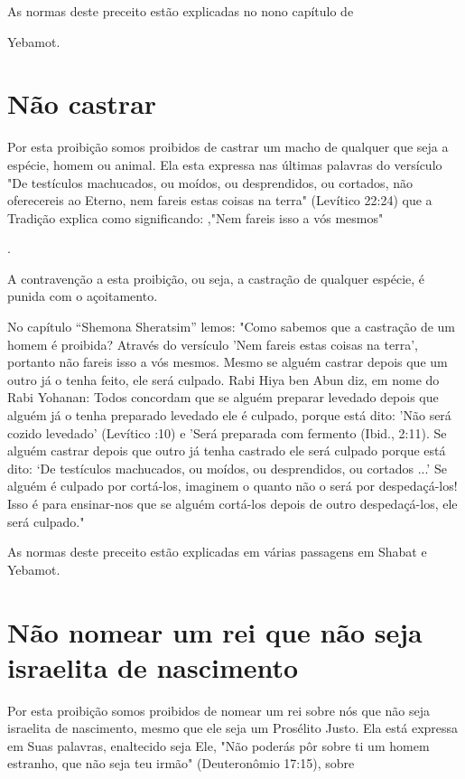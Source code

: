 As normas deste preceito estão explicadas no nono capítulo de


Yebamot.

\section{Não castrar}

Por esta proibição somos proibidos de castrar um macho de qual­quer que
seja a espécie, homem ou animal. Ela esta expressa nas últimas pala­vras
do versículo "De testículos machucados, ou moídos, ou desprendidos, ou
cortados, não oferecereis ao Eterno, nem fareis estas coisas na terra"
(Levítico 22:24) que a Tradição explica como significando: ,"Nem fareis
isso a vós mesmos"

.

A contravenção a esta proibição, ou seja, a castração de qualquer
es­pécie, é punida com o açoitamento.

No capítulo ``Shemona Sheratsim'' lemos: "Como sabemos que a cas­tração de
um homem é proibida? Através do versículo 'Nem fareis estas coisas na
terra', portanto não fareis isso a vós mesmos. Mesmo se alguém castrar
de­pois que um outro já o tenha feito, ele será culpado. Rabi Hiya ben
Abun diz, em nome do Rabi Yohanan: Todos concordam que se alguém
preparar leveda­do depois que alguém já o tenha preparado levedado ele é
culpado, porque está dito: 'Não será cozido levedado' (Levítico :10) e
'Será preparada com fer­mento (Ibid., 2:11). Se alguém castrar depois
que outro já tenha castrado ele será culpado porque está dito: `De
testículos machucados, ou moídos, ou des­prendidos, ou cortados ...' Se
alguém é culpado por cortá-los, imaginem o quanto não o será por
despedaçá-los! Isso é para ensinar-nos que se alguém cortá-los depois de
outro despedaçá-los, ele será culpado."

As normas deste preceito estão explicadas em várias passagens em Shabat
e Yebamot.

\section{Não nomear um rei que não seja israelita de nascimento}

Por esta proibição somos proibidos de nomear um rei sobre nós que não
seja israelita de nascimento, mesmo que ele seja um Prosélito Justo. Ela
es­tá expressa em Suas palavras, enaltecido seja Ele, "Não poderás pôr
sobre ti um homem estranho, que não seja teu irmão" (Deuteronômio
17:15), sobre


